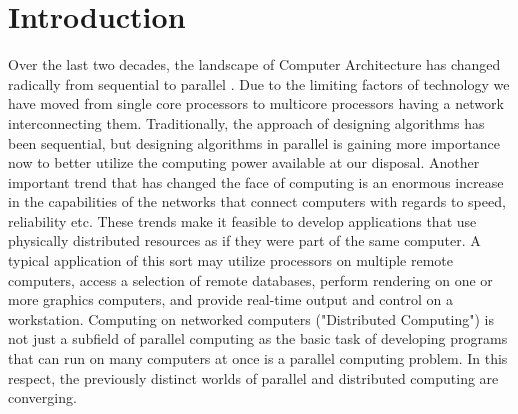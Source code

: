 \chapter{Introduction}\label{chapter:introduction}
Over the last two decades, the landscape of Computer Architecture has changed radically from sequential to parallel . Due to the limiting factors of technology we have moved from single core processors to multicore processors having a network interconnecting them. Traditionally, the approach of designing algorithms has been sequential, but designing algorithms in parallel is gaining more importance now to better utilize the computing power available at our disposal. Another important trend that has changed the face of computing is an enormous increase in the capabilities of the networks that connect computers with regards to speed, reliability etc. These trends make it feasible to develop applications that use physically distributed resources as if they were part of the same computer. A typical application of this sort may utilize processors on multiple remote computers, access a selection of remote databases, perform rendering on one or more graphics computers, and provide real-time output and control on a workstation. Computing on networked computers ("Distributed Computing") is not just a subfield of parallel computing as the basic task of developing programs that can run on many computers at once is a parallel computing problem. In this respect, the previously distinct worlds of parallel and distributed computing are converging.\\ \par
\noindent
